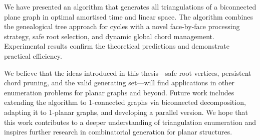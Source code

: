 We have presented an algorithm that generates all triangulations of a biconnected plane graph in optimal amortised time and linear space. 
The algorithm combines the genealogical tree approach for cycles with a novel face-by-face processing strategy, safe root selection, and dynamic global chord management. 
Experimental results confirm the theoretical predictions and demonstrate practical efficiency.

We believe that the ideas introduced in this thesis—safe root vertices, persistent chord pruning, and the valid generating set—will find applications in other enumeration problems for planar graphs and beyond. 
Future work includes extending the algorithm to 1-connected graphs via biconnected decomposition, adapting it to 1-planar graphs, and developing a parallel version. 
We hope that this work contributes to a deeper understanding of triangulation enumeration and inspires further research in combinatorial generation for planar structures.